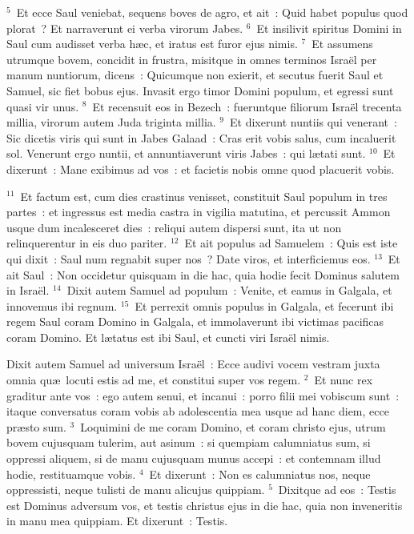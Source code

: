 ${}^{5}$~Et ecce Saul veniebat, sequens boves de agro, et ait~: Quid habet populus quod plorat~? Et narraverunt ei verba virorum Jabes.
${}^{6}$~Et insilivit spiritus Domini in Saul cum audisset verba h\ae c, et iratus est furor ejus nimis.
${}^{7}$~Et assumens utrumque bovem, concidit in frustra, misitque in omnes terminos Isra\"el per manum nuntiorum, dicens~: Quicumque non exierit, et secutus fuerit Saul et Samuel, sic fiet bobus ejus. Invasit ergo timor Domini populum, et egressi sunt quasi vir unus.
${}^{8}$~Et recensuit eos in Bezech~: fueruntque filiorum Isra\"el trecenta millia, virorum autem Juda triginta millia.
${}^{9}$~Et dixerunt nuntiis qui venerant~: Sic dicetis viris qui sunt in Jabes Galaad~: Cras erit vobis salus, cum incaluerit sol. Venerunt ergo nuntii, et annuntiaverunt viris Jabes~: qui l\ae tati sunt.
${}^{10}$~Et dixerunt~: Mane exibimus ad vos~: et facietis nobis omne quod placuerit vobis.


${}^{11}$~Et factum est, cum dies crastinus venisset, constituit Saul populum in tres partes~: et ingressus est media castra in vigilia matutina, et percussit Ammon usque dum incalesceret dies~: reliqui autem dispersi sunt, ita ut non relinquerentur in eis duo pariter.
${}^{12}$~Et ait populus ad Samuelem~: Quis est iste qui dixit~: Saul num regnabit super nos~? Date viros, et interficiemus eos.
${}^{13}$~Et ait Saul~: Non occidetur quisquam in die hac, quia hodie fecit Dominus salutem in Isra\"el.
${}^{14}$~Dixit autem Samuel ad populum~: Venite, et eamus in Galgala, et innovemus ibi regnum.
${}^{15}$~Et perrexit omnis populus in Galgala, et fecerunt ibi regem Saul coram Domino in Galgala, et immolaverunt ibi victimas pacificas coram Domino. Et l\ae tatus est ibi Saul, et cuncti viri Isra\"el nimis.

\lettrine[lines=10,image=true,loversize=0.05,lraise=-0.03]{D}{}ixit autem Samuel ad universum Isra\"el~: Ecce audivi vocem vestram juxta omnia qu\ae\ locuti estis ad me, et constitui super vos regem.
${}^{2}$~Et nunc rex graditur ante vos~: ego autem senui, et incanui~: porro filii mei vobiscum sunt~: itaque conversatus coram vobis ab adolescentia mea usque ad hanc diem, ecce pr\ae sto sum.
${}^{3}$~Loquimini de me coram Domino, et coram christo ejus, utrum bovem cujusquam tulerim, aut asinum~: si quempiam calumniatus sum, si oppressi aliquem, si de manu cujusquam munus accepi~: et contemnam illud hodie, restituamque vobis.
${}^{4}$~Et dixerunt~: Non es calumniatus nos, neque oppressisti, neque tulisti de manu alicujus quippiam.
${}^{5}$~Dixitque ad eos~: Testis est Dominus adversum vos, et testis christus ejus in die hac, quia non inveneritis in manu mea quippiam. Et dixerunt~: Testis.


